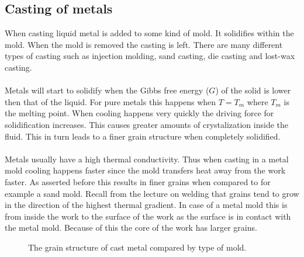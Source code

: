 \documentclass[11pt, a4paper]{article}
\begin{document}
\subsection{Casting of metals}
When casting liquid metal is added to some kind of mold. It solidifies within the mold. When the mold is removed the casting is left. There are many different types of casting such as injection molding, sand casting, die casting and lost-wax casting.\\
\\
Metals will start to solidify when the Gibbs free energy ($G$) of the solid is lower then that of the liquid. For pure metals this happens when $T = T_m$ where $T_m$ is the melting point. When cooling happens very quickly the driving force for solidification increases. This causes greater amounts of crystalization inside the fluid. This in turn leads to a finer grain structure when completely solidified.\\
\\
Metals usually have a high thermal conductivity. Thus when casting in a metal mold cooling happens faster since the mold transfers heat away from the work faster. As asserted before this results in finer grains when compared to for example a sand mold. Recall from the lecture on welding that grains tend to grow in the direction of the highest thermal gradient. In case of a metal mold this is from inside the work to the surface of the work as the surface is in contact with the metal mold. Because of this the core of the work has larger grains.
\begin{figure}[h]
  \centering
  \qquad
  \caption{The grain structure of cast metal compared by type of mold.}
\end{figure}
\end{document}
